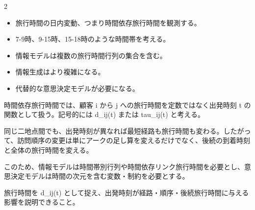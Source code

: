 \begin{multicols}{2}

\footnotesize

\raggedcolumns


\begin{itemize}
\item 旅行時間の日内変動、つまり時間依存旅行時間を観測する。
\item 7-9時、9-15時、15-18時のような時間帯を考える。
\item 情報モデルは複数の旅行時間行列の集合を含む。
\item 情報生成はより複雑になる。
\item 代替的な意思決定モデルが必要になる。
\end{itemize}

時間依存旅行時間では、顧客 i から j への旅行時間を定数ではなく出発時刻 t の関数として扱う。記号的には d\_ij(t) または tau\_ij(t) と考える。\par

同じ二地点間でも、出発時刻が異なれば最短経路も旅行時間も変わる。したがって、訪問順序の変更は単にアークの足し算を変えるだけでなく、後続の到着時刻と全体の旅行時間を変える。\par

このため、情報モデルは時間帯別行列や時間依存リンク旅行時間を必要とし、意思決定モデルは時間の次元を含む変数・制約を必要とする。\par

旅行時間を d\_ij(t) として捉え、出発時刻が経路・順序・後続旅行時間に与える影響を説明できること。\par


\end{multicols}
